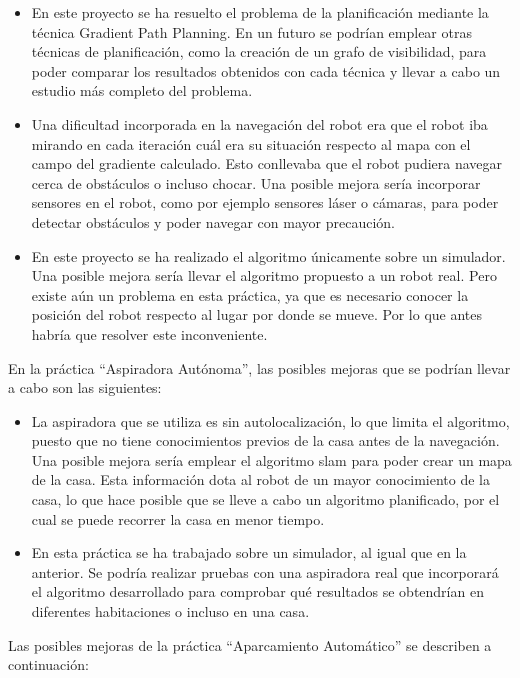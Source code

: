 \begin{itemize}
\item En este proyecto se ha resuelto el problema de la planificación mediante la técnica Gradient Path Planning. En un futuro se podrían emplear otras técnicas de planificación, como la creación de un grafo de visibilidad, para poder comparar los resultados obtenidos con cada técnica y llevar a cabo un estudio más completo del problema.
\item Una dificultad incorporada en la navegación del robot era que el robot iba mirando en cada iteración cuál era su situación respecto al mapa con el campo del gradiente calculado. Esto conllevaba que el robot pudiera navegar cerca de obstáculos o incluso chocar. Una posible mejora sería incorporar sensores en el robot, como por ejemplo sensores láser o cámaras, para poder detectar obstáculos y poder navegar con mayor precaución.
\item En este proyecto se ha realizado el algoritmo únicamente sobre un simulador. Una posible mejora sería llevar el algoritmo propuesto a un robot real. Pero existe aún un problema en esta práctica, ya que es necesario conocer la posición del robot respecto al lugar por donde se mueve. Por lo que antes habría que resolver este inconveniente.
\end{itemize}

En la práctica ``Aspiradora Autónoma'', las posibles mejoras que se podrían llevar a cabo son las siguientes:

\begin{itemize}
\item La aspiradora que se utiliza es sin autolocalización, lo que limita el algoritmo, puesto que no tiene conocimientos previos de la casa antes de la navegación. Una posible mejora sería emplear el algoritmo \acrshort{slam} para poder crear un mapa de la casa. Esta información dota al robot de un mayor conocimiento de la casa, lo que hace posible que se lleve a cabo un algoritmo planificado, por el cual se puede recorrer la casa en menor tiempo.\\
\item En esta práctica se ha trabajado sobre un simulador, al igual que en la anterior. Se podría realizar pruebas con una aspiradora real que incorporará el algoritmo desarrollado para comprobar qué resultados se obtendrían en diferentes habitaciones o incluso en una casa.
\end{itemize}

Las posibles mejoras de la práctica ``Aparcamiento Automático'' se describen a continuación:

